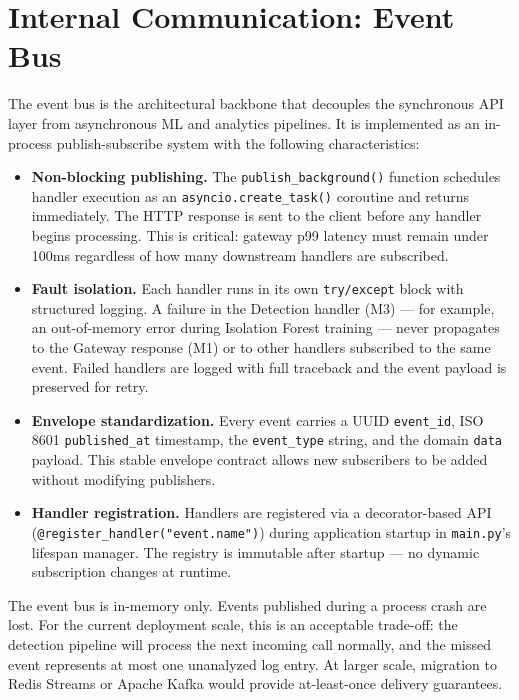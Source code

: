 \documentclass[12pt,a4paper,twoside]{report}
\begin{document}
\section{Internal Communication: Event Bus}

The event bus is the architectural backbone that decouples the synchronous API layer from asynchronous ML and analytics pipelines. It is implemented as an in-process publish-subscribe system with the following characteristics:

\begin{itemize}
  \item \textbf{Non-blocking publishing.} The \texttt{publish\_background()} function schedules handler execution as an \texttt{asyncio.create\_task()} coroutine and returns immediately. The HTTP response is sent to the client before any handler begins processing. This is critical: gateway p99 latency must remain under 100ms regardless of how many downstream handlers are subscribed.

  \item \textbf{Fault isolation.} Each handler runs in its own \texttt{try/except} block with structured logging. A failure in the Detection handler (M3) — for example, an out-of-memory error during Isolation Forest training — never propagates to the Gateway response (M1) or to other handlers subscribed to the same event. Failed handlers are logged with full traceback and the event payload is preserved for retry.

  \item \textbf{Envelope standardization.} Every event carries a UUID \texttt{event\_id}, ISO 8601 \texttt{published\_at} timestamp, the \texttt{event\_type} string, and the domain \texttt{data} payload. This stable envelope contract allows new subscribers to be added without modifying publishers.

  \item \textbf{Handler registration.} Handlers are registered via a decorator-based API (\texttt{@register\_handler("event.name")}) during application startup in \texttt{main.py}'s lifespan manager. The registry is immutable after startup — no dynamic subscription changes at runtime.
\end{itemize}

\begin{warningbox}
The event bus is in-memory only. Events published during a process crash are lost. For the current deployment scale, this is an acceptable trade-off: the detection pipeline will process the next incoming call normally, and the missed event represents at most one unanalyzed log entry. At larger scale, migration to Redis Streams or Apache Kafka would provide at-least-once delivery guarantees.
\end{warningbox}
\end{document}
